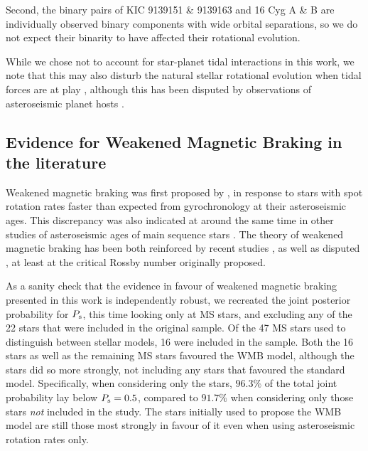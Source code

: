 Second, the binary pairs of KIC 9139151 \& 9139163 and 16 Cyg A \& B are individually observed binary components with wide orbital separations, so we do not expect their binarity to have affected their rotational evolution. 

While we chose not to account for star-planet tidal interactions in this work, we note that this may also disturb the natural stellar rotational evolution when tidal forces are at play \cite{maxted+2015,gallet+delorme2019, benbakoura+2019}, although this has been disputed by observations of asteroseismic planet hosts \cite{ceillier+2016}.\\

\subsection{Evidence for Weakened Magnetic Braking in the literature}
Weakened magnetic braking was first proposed by \cite{vansaders+2016}, in response to stars with spot rotation rates faster than expected from gyrochronology at their asteroseismic ages. This discrepancy was also indicated at around the same time in other studies of asteroseismic ages of main sequence stars \cite{nielsen+2015, angus+2015, davies+2015}. The theory of weakened magnetic braking has been both reinforced by recent studies \cite{metcalfe+egeland2019}, as well as disputed \cite{lorenzo-oliveira+2019}, at least at the critical Rossby number originally proposed.

As a sanity check that the evidence in favour of weakened magnetic braking presented in this work is independently robust, we recreated the joint posterior probability for $P_{\rm s}$, this time looking only at MS stars, and excluding any of the 22 stars that were included in the original \cite{vansaders+2016} sample. Of the 47 MS stars used to distinguish between stellar models, 16 were included in the \cite{vansaders+2016} sample. Both the 16 \cite{vansaders+2016} stars as well as the remaining MS stars favoured the WMB model, although the \cite{vansaders+2016} stars did so more strongly, not including any stars that favoured the standard model. Specifically, when considering only the \cite{vansaders+2016} stars, $96.3\%$ of the total joint probability lay below $P_{\rm s} = 0.5$, compared to $91.7\%$ when considering only those stars \emph{not} included in the \cite{vansaders+2016} study. The stars initially used to propose the WMB model are still those most strongly in favour of it even when using asteroseismic rotation rates only. 

